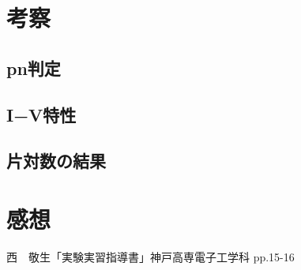 \documentclass[11pt]{jarticle}
\begin{document}
\section{考察}
	\subsection{pn判定}
	\subsection{I−V特性}
	\subsection{片対数の結果}
\section{感想}

\begin{thebibliography}{99}
西　敬生「実験実習指導書」神戸高専電子工学科 pp.15-16
\end{thebibliography}
\end{document}
